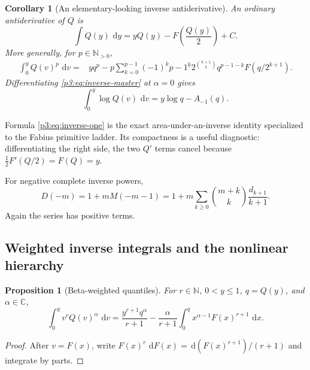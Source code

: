 \documentclass[11pt,oneside]{article}
\newtheorem{proposition}[theorem]{Proposition}
\newtheorem{corollary}[theorem]{Corollary}
\theoremstyle{definition}
\theoremstyle{remark}
\newcommand{\C}{\mathbb C}
\newcommand{\N}{\mathbb N}
\newcommand{\dd}{\,\mathrm d}
\newcommand{\fall}[2]{#1^{\underline{#2}}}
\newcommand{\1}{\mathbf 1}
\begin{document}
\begin{corollary}[An elementary-looking inverse antiderivative]
\label{p3:cor:inverse-one}
An ordinary antiderivative of $Q$ is
\begin{equation}
 \boxed{
 \int Q(y)\,\dd y
 =yQ(y)-F\!\left(\frac{Q(y)}2\right)+C.}
 \label{p3:eq:inverse-one}
\end{equation}
More generally, for $p\in\N_{>0}$,
\begin{align}
 \int_0^yQ(v)^p\,\dd v
 ={}&yq^p
 -p\sum_{k=0}^{p-1}(-1)^k\fall{p-1}k
 2^{\binom{k+1}{2}}q^{p-1-k}F(q/2^{k+1}).                   \label{p3:eq:inverse-integer}
\end{align}
Differentiating \eqref{p3:eq:inverse-master} at $\alpha=0$ gives
\begin{equation}
 \int_0^y\log Q(v)\,\dd v=y\log q-A_{-1}(q).                \label{p3:eq:inverse-log}
\end{equation}
\end{corollary}

Formula \eqref{p3:eq:inverse-one} is the exact area-under-an-inverse identity specialized to the
Fabius primitive ladder.  Its compactness is a useful diagnostic: differentiating the right
side, the two $Q'$ terms cancel because
$\tfrac12F'(Q/2)=F(Q)=y$.

For negative complete inverse powers,
\begin{equation}
 D(-m)=1+mM(-m-1)
 =1+m\sum_{k\ge0}\binom{m+k}{k}\frac{d_{k+1}}{k+1}.           \label{p3:eq:inverse-negative-complete}
\end{equation}
Again the series has positive terms.

\subsection{Weighted inverse integrals and the nonlinear hierarchy}

\begin{proposition}[Beta-weighted quantiles]
\label{p3:prop:weighted-inverse}
For $r\in\N$, $0<y\le1$, $q=Q(y)$, and $\alpha\in\C$,
\begin{equation}
 \boxed{
 \int_0^yv^rQ(v)^\alpha\,\dd v
 =\frac{y^{r+1}q^\alpha}{r+1}
 -\frac{\alpha}{r+1}\int_0^qx^{\alpha-1}F(x)^{r+1}\,\dd x.}
 \label{p3:eq:weighted-inverse}
\end{equation}
\end{proposition}

\begin{proof}
After $v=F(x)$, write $F(x)^r\,\dd F(x)=\dd(F(x)^{r+1})/(r+1)$ and integrate by parts.
\end{proof}
\end{document}
